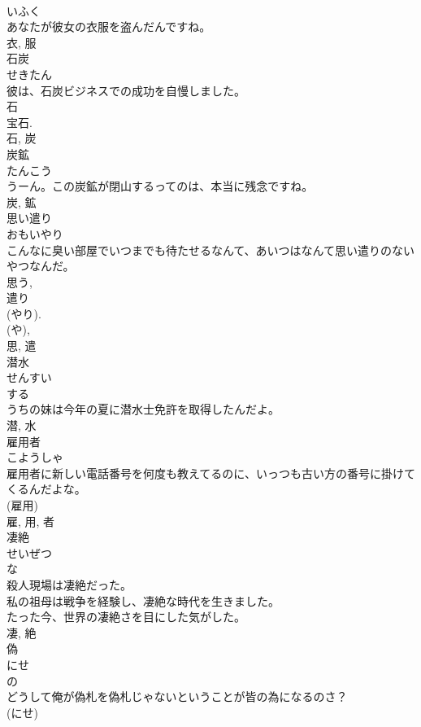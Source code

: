 \documentclass[8pt]{extreport}
\begin{document}
\begin{CJK}{UTF8}{min}
\\	いふく	
\\	あなたが彼女の衣服を盗んだんですね。	
\\	衣, 服	
\\	石炭	
\\	せきたん	
\\	彼は、石炭ビジネスでの成功を自慢しました。	
\\	石 
\\	宝石. 
\\	石, 炭	
\\	炭鉱	
\\	たんこう	
\\	うーん。この炭鉱が閉山するってのは、本当に残念ですね。	
\\	炭, 鉱	
\\	思い遣り	
\\	おもいやり	
\\	こんなに臭い部屋でいつまでも待たせるなんて、あいつはなんて思い遣りのないやつなんだ。	
\\	思う, 
\\	遣り 
\\	(やり). 
\\	(や), 
\\	思, 遣	
\\	潜水	
\\	せんすい	
\\	する 
\\	うちの妹は今年の夏に潜水士免許を取得したんだよ。	
\\	潜, 水	
\\	雇用者	
\\	こようしゃ	
\\	雇用者に新しい電話番号を何度も教えてるのに、いっつも古い方の番号に掛けてくるんだよな。	
\\	(雇用) 
\\	雇, 用, 者	
\\	凄絶	
\\	せいぜつ	
\\	な 
\\	殺人現場は凄絶だった。	
\\	私の祖母は戦争を経験し、凄絶な時代を生きました。	
\\	たった今、世界の凄絶さを目にした気がした。	
\\	凄, 絶	
\\	偽	
\\	にせ	
\\	の 
\\	どうして俺が偽札を偽札じゃないということが皆の為になるのさ？	
\\	(にせ) 

\end{CJK}
\end{document}
